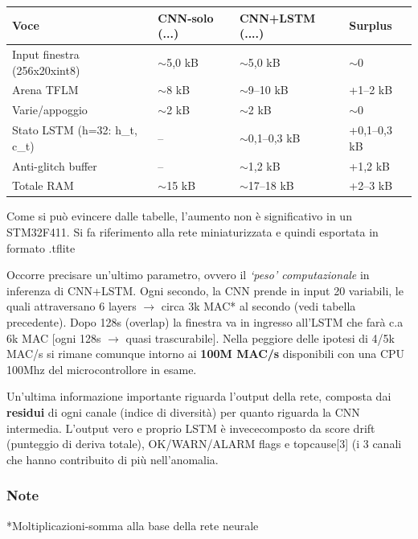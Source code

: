 \begin{table}[h]
\centering
\begin{tabular}{l l l l}
\toprule
Voce & CNN-solo (...) & CNN+LSTM (....) & Surplus \\
\midrule
Input finestra (256x20xint8)          & $\sim$5,0 kB  & $\sim$5,0 kB        & $\sim$0        \\
Arena TFLM                             & $\sim$8 kB    & $\sim$9--10 kB      & +1--2 kB       \\
Varie/appoggio                         & $\sim$2 kB    & $\sim$2 kB          & $\sim$0        \\
Stato LSTM (h=32: h\_t, c\_t)          & --            & $\sim$0,1--0,3 kB   & +0,1--0,3 kB   \\
Anti-glitch buffer & --      & $\sim$1,2 kB        & +1,2 kB        \\
\midrule
Totale RAM                             & $\sim$15 kB   & $\sim$17--18 kB     & +2--3 kB       \\
\bottomrule
\end{tabular}
\end{table}

Come si può evincere dalle tabelle, l’aumento non è significativo in un STM32F411. Si fa riferimento alla rete miniaturizzata e quindi esportata in formato .tflite

Occorre precisare un’ultimo parametro, ovvero il \textit{‘peso’ computazionale} in inferenza di CNN+LSTM. Ogni secondo, la CNN prende in input 20 variabili, le quali attraversano 6 layers $\rightarrow$ circa 3k MAC* al secondo (vedi tabella precedente). Dopo 128s (overlap) la finestra va in ingresso all’LSTM che farà c.a 6k MAC [ogni 128s $\rightarrow$ quasi trascurabile]. Nella peggiore delle ipotesi di 4/5k MAC/s si rimane comunque intorno ai \textbf{100M MAC/s} disponibili con una CPU 100Mhz del microcontrollore in esame.

Un’ultima informazione importante riguarda l’output della rete, composta dai \textbf{residui} di ogni canale (indice di diversità) per quanto riguarda la CNN intermedia. L’output vero e proprio LSTM è invececomposto da score drift (punteggio di deriva totale), OK/WARN/ALARM flags e topcause[3] (i 3 canali che hanno contribuito di più nell’anomalia.

\subsubsection{Note}
*Moltiplicazioni-somma alla base della rete neurale

